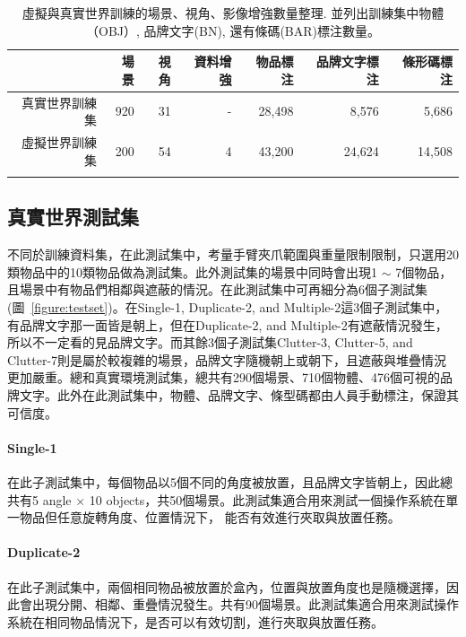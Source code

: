 \begin{table}[H]
\caption{虛擬與真實世界訓練的場景、視角、影像增強數量整理. 並列出訓練集中物體（OBJ）, 品牌文字(BN), 還有條碼(BAR)標注數量。}
\centering
\begin{tabular}{rrrr|rrr}
\hline
         & 場景 & 視角 & 資料增強 & 物品標注       & 品牌文字標注       & 條形碼標注 \\ \hline
真實世界訓練集 	& 920   & 31   & -        & 28,498       & 8,576    & 5,686     \\
虛擬世界訓練集   	& 200   & 54   & 4      & 43,200       & 24,624         & 14,508          \\
\hline
\label{table:training_set_table}
\end{tabular}
\end{table}

\subsection{真實世界測試集}
不同於訓練資料集，在此測試集中，考量手臂夾爪範圍與重量限制限制，只選用20類物品中的10類物品做為測試集。此外測試集的場景中同時會出現1 $\sim$ 7個物品，且場景中有物品們相鄰與遮蔽的情況。在此測試集中可再細分為6個子測試集(圖~\ref{figure:testset})。在Single-1, Duplicate-2, and Multiple-2這3個子測試集中，有品牌文字那一面皆是朝上，但在Duplicate-2, and Multiple-2有遮蔽情況發生，所以不一定看的見品牌文字。而其餘3個子測試集Clutter-3, Clutter-5, and Clutter-7則是屬於較複雜的場景，品牌文字隨機朝上或朝下，且遮蔽與堆疊情況更加嚴重。總和真實環境測試集，總共有290個場景、710個物體、476個可視的品牌文字。此外在此測試集中，物體、品牌文字、條型碼都由人員手動標注，保證其可信度。

\paragraph{Single-1}
在此子測試集中，每個物品以5個不同的角度被放置，且品牌文字皆朝上，因此總共有5 angle $\times$ 10 objects，共50個場景。此測試集適合用來測試一個操作系統在單一物品但任意旋轉角度、位置情況下， 能否有效進行夾取與放置任務。

\paragraph{Duplicate-2}
在此子測試集中，兩個相同物品被放置於盒內，位置與放置角度也是隨機選擇，因此會出現分開、相鄰、重疊情況發生。共有90個場景。此測試集適合用來測試操作系統在相同物品情況下，是否可以有效切割，進行夾取與放置任務。

